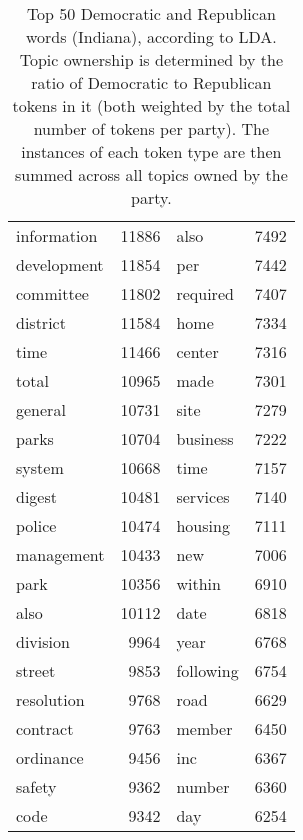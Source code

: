 \begin{table}[ht]
\begin{tabular}{lrlr}
  information & 11886 & also & 7492 \\ 
  development & 11854 & per & 7442 \\ 
  committee & 11802 & required & 7407 \\ 
  district & 11584 & home & 7334 \\ 
  time & 11466 & center & 7316 \\ 
  total & 10965 & made & 7301 \\ 
  general & 10731 & site & 7279 \\ 
  parks & 10704 & business & 7222 \\ 
  system & 10668 & time & 7157 \\ 
  digest & 10481 & services & 7140 \\ 
  police & 10474 & housing & 7111 \\ 
  management & 10433 & new & 7006 \\ 
  park & 10356 & within & 6910 \\ 
  also & 10112 & date & 6818 \\ 
  division & 9964 & year & 6768 \\ 
  street & 9853 & following & 6754 \\ 
  resolution & 9768 & road & 6629 \\ 
  contract & 9763 & member & 6450 \\ 
  ordinance & 9456 & inc & 6367 \\ 
  safety & 9362 & number & 6360 \\ 
  code & 9342 & day & 6254 \\ 
   \hline
\end{tabular}
\endgroup
\caption{Top 50 Democratic and Republican words (Indiana), according to LDA. 
             Topic ownership is determined by the ratio of Democratic to Republican tokens in 
             it (both weighted by the total number of tokens per party). The instances of each 
             token type are then summed across all topics owned by the party.} 
\label{tabLDAIN}
\end{table}

